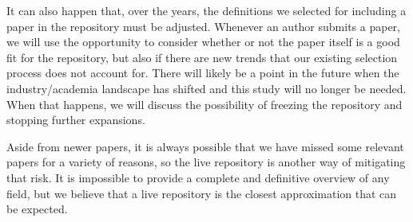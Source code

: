 It can also happen that, over the years, the definitions we selected for including a paper in the repository must be adjusted.
Whenever an author submits a paper, we will use the opportunity to consider whether or not the paper itself is a good fit for the repository, but also if there are new trends that our existing selection process does not account for.
There will likely be a point in the future when the industry/academia landscape has shifted and this study will no longer be needed.
When that happens, we will discuss the possibility of freezing the repository and stopping further expansions.

Aside from newer papers, it is always possible that we have missed some relevant papers for a variety of reasons, so the live repository is another way of mitigating that risk.
It is impossible to provide a complete and definitive overview of any field, but we believe that a live repository is the closest approximation that can be expected.

